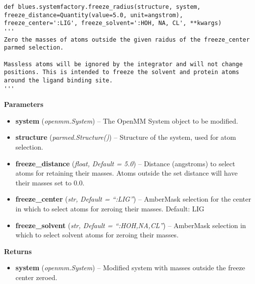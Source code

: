 \begin{description}
\begin{verbatim}
def blues.systemfactory.freeze_radius(structure, system, freeze_distance=Quantity(value=5.0, unit=angstrom), freeze_center=':LIG', freeze_solvent=':HOH, NA, CL', **kwargs)
'''
Zero the masses of atoms outside the given raidus of the freeze_center
parmed selection.

Massless atoms will be ignored by the integrator and will not change
positions. This is intended to freeze the solvent and protein atoms
around the ligand binding site.
'''
\end{verbatim}


\begin{description}
\item
    \textbf{Parameters}
\begin{itemize}
\item
  \textbf{system} (\emph{openmm.System}) -- The OpenMM System object to
  be modified.
\item
  \textbf{structure} (\emph{parmed.Structure()}) -- Structure of the
  system, used for atom selection.
\item
  \textbf{freeze\_distance} (\emph{float, Default = 5.0}) -- Distance
  (angstroms) to select atoms for retaining their masses. Atoms outside
  the set distance will have their masses set to 0.0.
\item
  \textbf{freeze\_center} (\emph{str, Default = ``:LIG''}) -- AmberMask
  selection for the center in which to select atoms for zeroing their
  masses. Default: LIG
\item
  \textbf{freeze\_solvent} (\emph{str, Default = ``:HOH,NA,CL''}) --
  AmberMask selection in which to select solvent atoms for zeroing their
  masses.
\end{itemize}
\item
    \textbf{Returns}
\begin{itemize}
    \item
        \textbf{system} (\emph{openmm.System}) -- Modified system with masses outside the freeze center zeroed.
\end{itemize}
\end{description}
\end{description}


